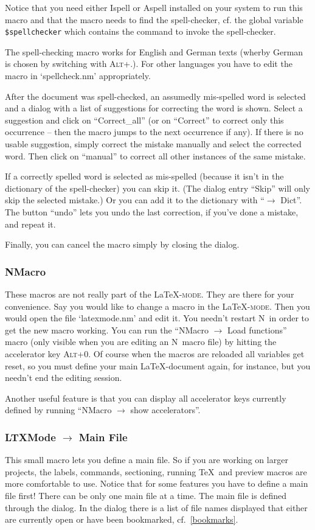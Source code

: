 \documentclass{article}
\newcommand{\latexpack}{\LaTeX-\textsc{mode}}
\newcommand{\nedit}{N\kern-0.8pt{Edit}}
\newcommand{\keyname}[1]{\textsc{#1}}
\newcommand{\file}[1]{`#1'}
\newcommand{\menu}[1]{``#1''}
\begin{document}
Notice that you need either Ispell or Aspell installed on your system to run this macro and that the macro needs to find the spell-checker, cf. the global variable
\texttt{\$spellchecker} which contains the command to invoke the spell-checker.

The spell-checking macro works for English and German texts (wherby German is chosen by switching with \keyname{Alt+.}). For other languages you have to edit the macro in \file{spellcheck.nm} appropriately. 

After the document was spell-checked, an assumedly mis-spelled word is selected and a dialog with a list of suggestions for correcting the word is shown. Select a suggestion and click on \menu{Correct\_all} (or on \menu{Correct} to correct only this occurrence -- then the macro jumps to the next occurrence if any). If there is no usable suggestion, simply correct the mistake manually and select the corrected word. Then click on \menu{manual} to correct all other instances of the same mistake.

If a correctly spelled word is selected as mis-spelled (because it isn't in the dictionary of the spell-checker) you can skip it. (The dialog entry \menu{Skip} will only skip the selected mistake.) Or you can add it to the dictionary with \menu{$\to$ Dict}. The button \menu{undo} lets you undo the last correction, if you've done a mistake, and repeat it.

Finally, you can cancel the macro simply by closing the dialog.


\subsubsection{NMacro} 
These macros are not really part of the \latexpack. They are there for your convenience. Say you would like to change a macro in the \latexpack. Then you would open the file \file{latexmode.nm} and edit it. You needn't restart \nedit\ in order to get the new macro working. You can run the \menu{NMacro $\to$ Load functions} macro (only visible when you are editing an \nedit\ macro file) by hitting the accelerator key \keyname{Alt+0}. Of course when the macros are reloaded all variables get reset, so you must define your main \LaTeX-document again, for instance, but you needn't end the editing session. 

Another useful feature is that you can display all accelerator keys currently defined by running \menu{NMacro $\to$ show accelerators}. 


\subsubsection{LTXMode $\to$ Main File}\label{mainfile}
This small macro lets you define a main file. So if you are working on larger projects, the labels, commands, sectioning, running \TeX\ and preview macros are more comfortable to use. Notice that for some features you have to define a main file first! There can be only one main file at a time. The main file is defined through the dialog. In the dialog there is a list of file names displayed that either are currently open or have been bookmarked, cf.~\ref{bookmarks}.
\end{document}
